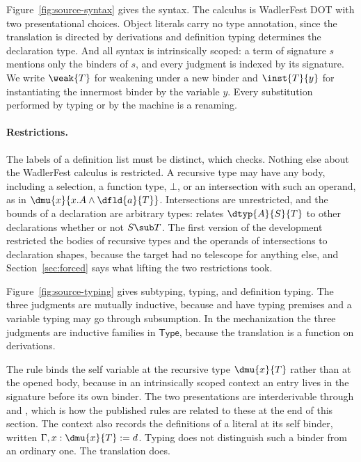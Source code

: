 Figure~\ref{fig:source-syntax} gives the syntax. The calculus is WadlerFest DOT \cite{amin2016essence} with two presentational choices. Object literals carry no type annotation, since the translation is directed by derivations and definition typing determines the declaration type. And all syntax is intrinsically scoped: a term of signature $s$ mentions only the binders of $s$, and every judgment is indexed by its signature. We write $\weak{T}$ for weakening under a new binder and $\inst{T}{y}$ for instantiating the innermost binder by the variable $y$. Every substitution performed by typing or by the machine is a renaming.

\paragraph{Restrictions.}
The labels of a definition list must be distinct, which  checks. Nothing else about the WadlerFest calculus is restricted. A recursive type may have any body, including a selection, a function type, $\bot$, or an intersection with such an operand, as in $\dmu{x}{x.A \wedge \dfld{a}{T}}$. Intersections are unrestricted, and the bounds of a declaration are arbitrary types:  relates $\dtyp{A}{S}{T}$ to other declarations whether or not $S \sub T$. The first version of the development restricted the bodies of recursive types and the operands of intersections to declaration shapes, because the target had no telescope for anything else, and Section~\ref{sec:forced} says what lifting the two restrictions took.

Figure~\ref{fig:source-typing} gives subtyping, typing, and definition typing. The three judgments are mutually inductive, because  and  have typing premises and a variable typing may go through subsumption. In the mechanization the three judgments are inductive families in $\mathsf{Type}$, because the translation is a function on derivations.

The rule  binds the self variable at the recursive type $\dmu{x}{T}$ rather than at the opened body, because in an intrinsically scoped context an entry lives in the signature before its own binder. The two presentations are interderivable through  and , which is how the published rules are related to these at the end of this section. The context also records the definitions of a literal at its self binder, written $\Gamma, x : \dmu{x}{T} \mathrel{:=} d$. Typing does not distinguish such a binder from an ordinary one. The translation does.

